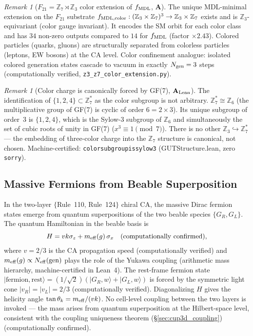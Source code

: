 \documentclass[11pt]{article}
\theoremstyle{remark}
\newtheorem{remark}[theorem]{Remark}
\newcommand{\lean}[1]{%
  \penalty-100
  \begingroup\def\_{\textunderscore\allowbreak}\texttt{#1}\endgroup}
\newcommand{\CatA}{\textbf{A}}
\newcommand{\CatAL}{\ensuremath{\textbf{A}_{\rm Lean}}}
\begin{document}
\begin{remark}[$F_{21} = \mathbb{Z}_7 \rtimes \mathbb{Z}_3$ color extension of $f_{\rm MDL}$, $\CatA$]
\label{rem:z3_color_extension}
The unique MDL-minimal extension on the $F_{21}$ substrate
$f_{\rm MDL,color} : (\mathbb{Z}_3 \times \mathbb{Z}_7)^3 \to \mathbb{Z}_3 \times \mathbb{Z}_7$
exists and is $\mathbb{Z}_3$-equivariant (color gauge invariant).
It encodes the SM orbit for each color class and has $34$ non-zero outputs
compared to $14$ for $f_{\rm MDL}$ (factor ${\times}2.43$).
Colored particles (quarks, gluons) are structurally separated from colorless
particles (leptons, EW bosons) at the CA level.
Color confinement analogue: isolated colored generation states cascade to vacuum
in exactly $N_{\rm gen} = 3$ steps
(computationally verified, \texttt{z3\_z7\_color\_extension.py}).
\end{remark}

\begin{remark}[Color charge is canonically forced by GF(7), $\CatAL$]
\label{rem:color_sylow3}
The identification of $\{1,2,4\} \subset \mathbb{Z}_7^*$ as the color subgroup is not arbitrary.
$\mathbb{Z}_7^* \cong \mathbb{Z}_6$ (the multiplicative group of GF(7) is cyclic of order $6 = 2 \times 3$).
Its unique subgroup of order~3 is $\{1,2,4\}$, which is the Sylow-3 subgroup of $\mathbb{Z}_6$
and simultaneously the set of cubic roots of unity in GF(7) ($x^3 \equiv 1 \pmod{7}$).
There is no other $\mathbb{Z}_3 \hookrightarrow \mathbb{Z}_7^*$ — the embedding of three-color charge
into the $\mathbb{Z}_7$ structure is canonical, not chosen.
Machine-certified: \lean{color\_subgroup\_is\_sylow3} (GUTStructure.lean, zero \texttt{sorry}).
\end{remark}

\subsection{Massive Fermions from Beable Superposition}
\label{sec:massive_fermions_beable}

In the two-layer $\{$Rule~110, Rule~124$\}$ chiral CA, the massive Dirac fermion states
emerge from quantum superpositions of the two beable species $\{G_R, G_L\}$.
The quantum Hamiltonian in the beable basis is
\begin{equation}
H = vk\sigma_z + m_{\rm eff}(g)\,\sigma_x \quad (\text{computationally confirmed}),
\end{equation}
where $v = 2/3$ is the CA propagation speed (computationally verified) and
$m_{\rm eff}(g) \propto N_{\rm eff}(\mathrm{gen})$ plays the role of the Yukawa coupling
(arithmetic mass hierarchy, machine-certified in Lean~4).
The rest-frame fermion state
$|\mathrm{fermion},\mathrm{rest}\rangle = (1/\sqrt{2})(|G_R,w\rangle + |G_L,w\rangle)$
is forced by the symmetric light cone $|v_R| = |v_L| = 2/3$ (computationally verified).
Diagonalizing $H$ gives the helicity angle $\tan\theta_k = m_{\rm eff}/(vk)$.
No cell-level coupling between the two layers is invoked --- the mass arises from
quantum superposition at the Hilbert-space level, consistent with the coupling
uniqueness theorem (\S\ref{sec:cup3d_coupling}) (computationally confirmed).
\end{document}
